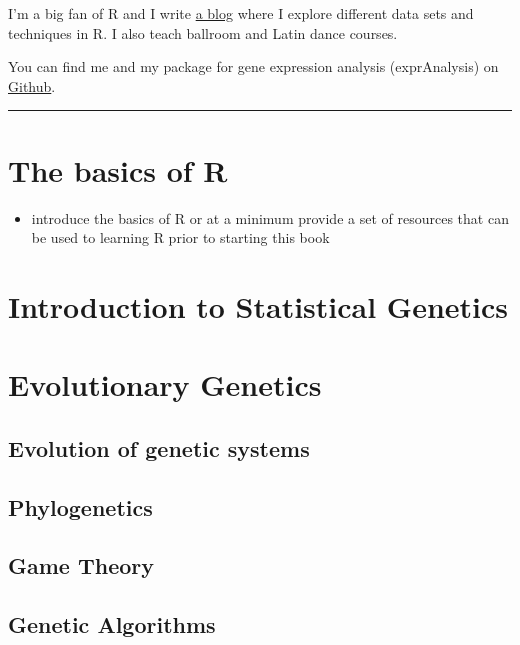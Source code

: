 \documentclass[12pt,]{book}
\providecommand{\tightlist}{%
  \setlength{\itemsep}{0pt}\setlength{\parskip}{0pt}}
\begin{document}
I'm a big fan of R and I write \href{https://shiring.github.io/}{a blog}
where I explore different data sets and techniques in R. I also teach
ballroom and Latin dance courses.

You can find me and my package for gene expression analysis
(exprAnalysis) on \href{https://github.com/ShirinG}{Github}.

\begin{center}\rule{0.5\linewidth}{\linethickness}\end{center}

\chapter*{The basics of R}\label{the-basics-of-r}


\begin{itemize}
\tightlist
\item
  introduce the basics of R or at a minimum provide a set of resources
  that can be used to learning R prior to starting this book
\end{itemize}

\chapter{Introduction to Statistical
Genetics}\label{introduction-to-statistical-genetics}

\chapter{Evolutionary Genetics}\label{evolutionary-genetics}

\section{Evolution of genetic
systems}\label{evolution-of-genetic-systems}

\section{Phylogenetics}\label{phylogenetics}

\section{Game Theory}\label{game-theory}

\section{Genetic Algorithms}\label{genetic-algorithms}
\end{document}
